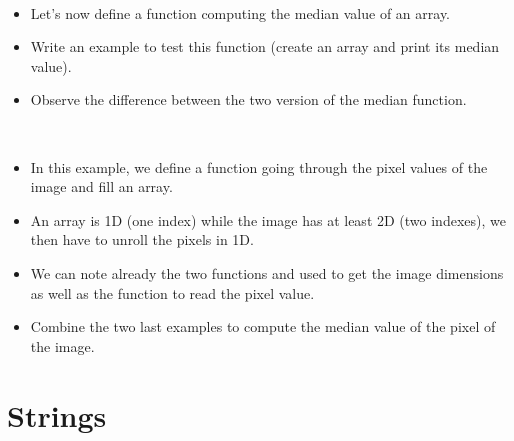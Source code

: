 \begin{frame}
  \begin{example}~\par
    \begin{itemize}
    \item Let's now define a function computing the median value of an array.\par
      
    \item Write an example to test this function (create an array and print its median value).
    \item Observe the difference between the two version of the median function.
    \end{itemize}

  \end{example}
\end{frame}

\begin{frame}
  \begin{example}~\par
    \begin{itemize}
    \item In this example, we define a function going through the pixel
      values of the image and fill an array.
    \item An array is 1D (one index) while the image has at least 2D
      (two indexes), we then have to unroll the pixels in 1D.
      
    \item We can note already the two functions  and
       used to get the image dimensions as well as the
      function  to read the pixel value.
    \item Combine the two last examples to compute the median value of
      the pixel of the image.
    \end{itemize}
  \end{example}
\end{frame}

\section{Strings}
